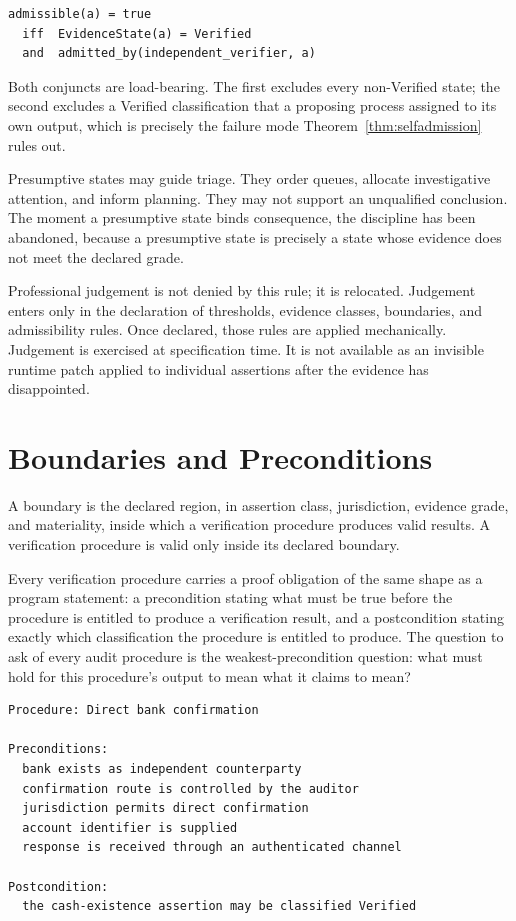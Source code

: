 \documentclass[smallcondensed,envcountsect,natbib]{svjour3}
\newcommand{\state}[1]{\textsf{#1}}
\begin{document}
\begin{lstlisting}
admissible(a) = true
  iff  EvidenceState(a) = Verified
  and  admitted_by(independent_verifier, a)
\end{lstlisting}

Both conjuncts are load-bearing. The first excludes every non-\state{Verified} state; the second excludes a \state{Verified} classification that a proposing process assigned to its own output, which is precisely the failure mode Theorem~\ref{thm:selfadmission} rules out.

Presumptive states may guide triage. They order queues, allocate investigative attention, and inform planning. They may not support an unqualified conclusion. The moment a presumptive state binds consequence, the discipline has been abandoned, because a presumptive state is precisely a state whose evidence does not meet the declared grade.

Professional judgement is not denied by this rule; it is relocated. Judgement enters only in the declaration of thresholds, evidence classes, boundaries, and admissibility rules. Once declared, those rules are applied mechanically. Judgement is exercised at specification time. It is not available as an invisible runtime patch applied to individual assertions after the evidence has disappointed.

\section{Boundaries and Preconditions}
\label{sec:boundaries}

\begin{definition}[Boundary]
\label{def:boundary}
A boundary is the declared region, in assertion class, jurisdiction, evidence grade, and materiality, inside which a verification procedure produces valid results. A verification procedure is valid only inside its declared boundary.
\end{definition}

Every verification procedure carries a proof obligation of the same shape as a program statement: a precondition stating what must be true before the procedure is entitled to produce a verification result, and a postcondition stating exactly which classification the procedure is entitled to produce. The question to ask of every audit procedure is the weakest-precondition question: what must hold for this procedure's output to mean what it claims to mean?

\begin{lstlisting}
Procedure: Direct bank confirmation

Preconditions:
  bank exists as independent counterparty
  confirmation route is controlled by the auditor
  jurisdiction permits direct confirmation
  account identifier is supplied
  response is received through an authenticated channel

Postcondition:
  the cash-existence assertion may be classified Verified
\end{lstlisting}
\end{document}
